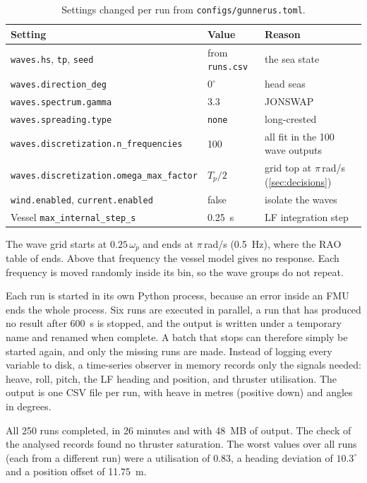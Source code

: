 \documentclass[11pt,a4paper]{article}
\newcommand{\Tp}{T_{p}}
\begin{document}
\begin{table}[htbp]
  \centering
  \caption{Settings changed per run from \texttt{configs/gunnerus.toml}.}
  \label{tab:run_settings}
  \begin{tabular}{@{}lll@{}}
    \toprule
    Setting & Value & Reason \\
    \midrule
    \texttt{waves.hs}, \texttt{tp}, \texttt{seed} & from \texttt{runs.csv} & the sea state \\
    \texttt{waves.direction\_deg} & $0^\circ$ & head seas \\
    \texttt{waves.spectrum.gamma} & 3.3 & JONSWAP \\
    \texttt{waves.spreading.type} & \texttt{none} & long-crested \\
    \texttt{waves.discretization.n\_frequencies} & 100 & all fit in the 100 wave outputs \\
    \texttt{waves.discretization.omega\_max\_factor} & $\Tp/2$ & grid top at $\pi$\,rad/s (\cref{sec:decisions}) \\
    \texttt{wind.enabled}, \texttt{current.enabled} & false & isolate the waves \\
    Vessel \texttt{max\_internal\_step\_s} & \SI{0.25}{s} & LF integration step \\
    \bottomrule
  \end{tabular}
\end{table}

The wave grid starts at $0.25\,\omega_p$ and ends at $\pi$\,rad/s (\SI{0.5}{Hz}), where the RAO
table of  ends. Above that frequency the vessel model gives no response. Each
frequency is moved randomly inside its bin, so the wave groups do not repeat.

Each run is started in its own Python process, because an error inside an FMU ends the whole
process. Six runs are executed in parallel, a run that has produced no result after
\SI{600}{s} is stopped, and the output is written under a temporary name and renamed when
complete. A batch that stops can therefore simply be started again, and only the missing runs
are made. Instead of logging every variable to disk, a time-series observer in memory records
only the signals needed: heave, roll, pitch, the LF heading and position, and thruster
utilisation. The output is one CSV file per run, with heave in metres (positive down) and
angles in degrees.

All 250 runs completed, in 26 minutes and with \SI{48}{MB} of output. The check of the
analysed records found no thruster saturation. The worst values over all runs (each from a
different run) were a utilisation of 0.83, a heading deviation of $10.3^\circ$ and a position
offset of \SI{11.75}{m}.
\end{document}
